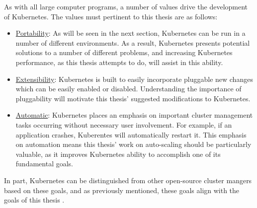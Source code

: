 As with all large computer programs, a number of values drive the development of
Kubernetes. The values must pertinent to this thesis are as follows:

\begin{itemize}
  \item \underline{Portability}: As will be seen in the next section,
    Kubernetes can be run in a number of different environments. As a result,
    Kubernetes presents potential solutions to a number of different problems, and
    increasing Kubernetes performance, as this thesis attempts to do, will assist in
    this ability.
  \item \underline{Extensibility}: Kubernetes is built to
    easily incorporate pluggable new changes which can be easily enabled or
    disabled. Understanding the importance of pluggability will motivate this
    thesis' suggested modifications to Kubernetes.
  \item \underline{Automatic}: Kubernetes places an emphasis on important
    cluster management tasks occurring without necessary user involvement. For
    example, if an application crashes, Kuberentes will automatically restart
    it. This emphasis on automation means this thesis' work on auto-scaling
    should be particularly valuable, as it improves Kubernetes ability to
    accomplish one of its fundamental goals.
\end{itemize}

In part, Kubernetes can be distinguished from other open-source cluster mangers
based on these goals, and as previously mentioned, these goals align with the
goals of this thesis \cite{what-is-k8s}.
